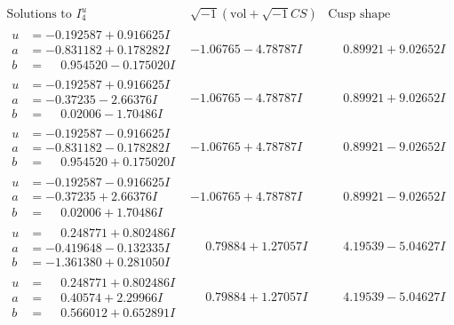 \documentclass[1p]{elsarticle_modified}
\theoremstyle{definition}
\newcommand{\I}{\sqrt{-1}}
\begin{document}
$$\begin{array}{c|c|c}  
\text{Solutions to }I^u_{4}& \I (\text{vol} + \sqrt{-1}CS) & \text{Cusp shape}\\
 \hline 
\begin{aligned}
u &= -0.192587 + 0.916625 I \\
a &= -0.831182 + 0.178282 I \\
b &= \phantom{-}0.954520 - 0.175020 I\end{aligned}
 & -1.06765 - 4.78787 I & \phantom{-}0.89921 + 9.02652 I \\ \hline\begin{aligned}
u &= -0.192587 + 0.916625 I \\
a &= -0.37235 - 2.66376 I \\
b &= \phantom{-}0.02006 - 1.70486 I\end{aligned}
 & -1.06765 - 4.78787 I & \phantom{-}0.89921 + 9.02652 I \\ \hline\begin{aligned}
u &= -0.192587 - 0.916625 I \\
a &= -0.831182 - 0.178282 I \\
b &= \phantom{-}0.954520 + 0.175020 I\end{aligned}
 & -1.06765 + 4.78787 I & \phantom{-}0.89921 - 9.02652 I \\ \hline\begin{aligned}
u &= -0.192587 - 0.916625 I \\
a &= -0.37235 + 2.66376 I \\
b &= \phantom{-}0.02006 + 1.70486 I\end{aligned}
 & -1.06765 + 4.78787 I & \phantom{-}0.89921 - 9.02652 I \\ \hline\begin{aligned}
u &= \phantom{-}0.248771 + 0.802486 I \\
a &= -0.419648 - 0.132335 I \\
b &= -1.361380 + 0.281050 I\end{aligned}
 & \phantom{-}0.79884 + 1.27057 I & \phantom{-}4.19539 - 5.04627 I \\ \hline\begin{aligned}
u &= \phantom{-}0.248771 + 0.802486 I \\
a &= \phantom{-}0.40574 + 2.29966 I \\
b &= \phantom{-}0.566012 + 0.652891 I\end{aligned}
 & \phantom{-}0.79884 + 1.27057 I & \phantom{-}4.19539 - 5.04627 I \\ \hline\begin{aligned}

\end{aligned}
\end{array}$$
\end{document}
